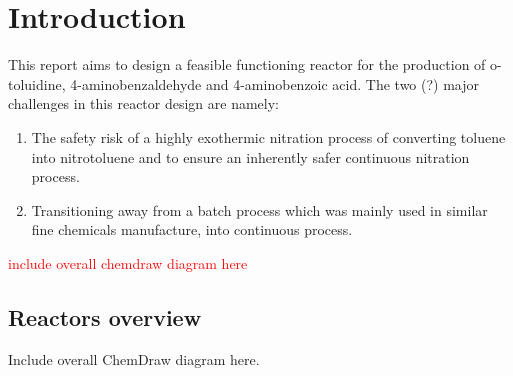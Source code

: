 \section{Introduction}
This report aims to design a feasible functioning reactor for the production of o-toluidine, 4-aminobenzaldehyde and 4-aminobenzoic acid. The two (?) major challenges in this reactor design are namely:
\begin{enumerate}
    \item The safety risk of a highly exothermic nitration process of converting toluene into nitrotoluene and to ensure an inherently safer continuous nitration process. 
    \item Transitioning away from a batch process which was mainly used in similar fine chemicals manufacture, into continuous process. 
\end{enumerate}




\textcolor{red}{include overall chemdraw diagram here}
\subsection{Reactors overview}
Include overall ChemDraw diagram here. 




